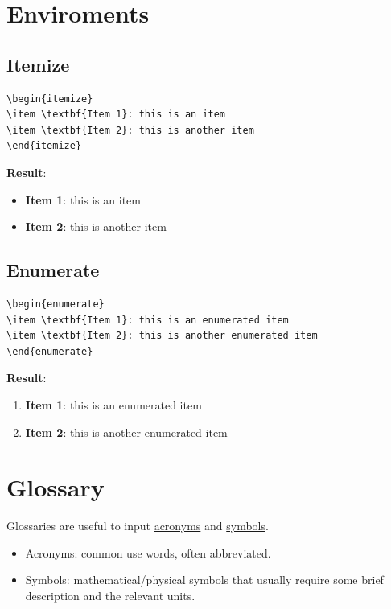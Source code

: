 \documentclass[11pt]{article}
\begin{document}
\section{Enviroments}
\label{sec:orgd96ea1a}
\subsection{Itemize}
\label{sec:orga57400f}
\lstset{language=[LaTeX]TeX,label= ,caption= ,captionpos=b,numbers=none}
\begin{lstlisting}
\begin{itemize}
\item \textbf{Item 1}: this is an item
\item \textbf{Item 2}: this is another item
\end{itemize}
\end{lstlisting}
\textbf{Result}:
\begin{itemize}
\item \textbf{Item 1}: this is an item
\item \textbf{Item 2}: this is another item
\end{itemize}

\subsection{Enumerate}
\label{sec:org56418de}
\lstset{language=[LaTeX]TeX,label= ,caption= ,captionpos=b,numbers=none}
\begin{lstlisting}
\begin{enumerate}
\item \textbf{Item 1}: this is an enumerated item
\item \textbf{Item 2}: this is another enumerated item
\end{enumerate}
\end{lstlisting}
\textbf{Result}:
\begin{enumerate}
\item \textbf{Item 1}: this is an enumerated item
\item \textbf{Item 2}: this is another enumerated item
\end{enumerate}

\section{Glossary}
\label{sec:org4fa9b69}
Glossaries are useful to input \uline{acronyms} and \uline{symbols}.
\begin{itemize}
\item Acronyms: common use words, often abbreviated.
\item Symbols: mathematical/physical symbols that usually require some brief
description and the relevant units.
\end{itemize}
\end{document}
